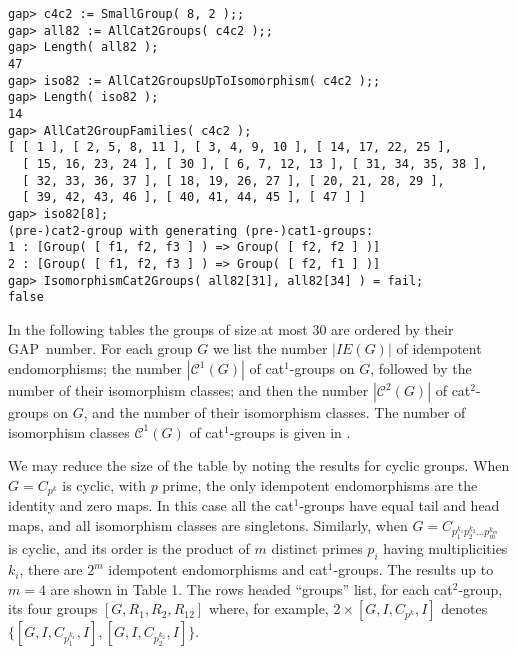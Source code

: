 \documentclass{ws-ijac}
\newcommand{\GAP}      {{\sf GAP}}
\newcommand{\calC}{\mathcal{C}}
\begin{document}
\small{
\begin{verbatim}
gap> c4c2 := SmallGroup( 8, 2 );;
gap> all82 := AllCat2Groups( c4c2 );;
gap> Length( all82 ); 
47
gap> iso82 := AllCat2GroupsUpToIsomorphism( c4c2 );;
gap> Length( iso82 ); 
14
gap> AllCat2GroupFamilies( c4c2 ); 
[ [ 1 ], [ 2, 5, 8, 11 ], [ 3, 4, 9, 10 ], [ 14, 17, 22, 25 ], 
  [ 15, 16, 23, 24 ], [ 30 ], [ 6, 7, 12, 13 ], [ 31, 34, 35, 38 ], 
  [ 32, 33, 36, 37 ], [ 18, 19, 26, 27 ], [ 20, 21, 28, 29 ], 
  [ 39, 42, 43, 46 ], [ 40, 41, 44, 45 ], [ 47 ] ]
gap> iso82[8]; 
(pre-)cat2-group with generating (pre-)cat1-groups:
1 : [Group( [ f1, f2, f3 ] ) => Group( [ f2, f2 ] )]
2 : [Group( [ f1, f2, f3 ] ) => Group( [ f2, f1 ] )]
gap> IsomorphismCat2Groups( all82[31], all82[34] ) = fail; 
false
\end{verbatim}
}

In the following tables the groups of size at most $30$ are ordered by their
\GAP\ number. 
For each group $G$ we list the number $|IE(G)|$ of idempotent endomorphisms; 
the number $|\calC^1(G)|$ of cat$^1$-groups on $G$, 
followed by the number of their isomorphism classes; 
and then the number $|\calC^2(G)|$ of cat$^2$-groups on $G$, 
and the number of their isomorphism classes. 
The number of isomorphism classes $\calC^1(G)$ of cat$^{1}$-groups 
is given in \cite{alp-wensley-ijac}. 

We may reduce the size of the table by noting the results for cyclic groups. 
When $G=C_{p^{k}}$ is cyclic, with $p$ prime, 
the only idempotent endomorphisms are the identity and zero maps. 
In this case all the cat$^1$-groups have equal tail and head maps, 
and all isomorphism classes are singletons. 
Similarly, when $G = C_{p_1^{k_1}p_2^{k_2} \ldots p_m^{k_m}}$ is cyclic, 
and its order is the product of $m$ distinct primes $p_i$ 
having multiplicities $k_i$, 
there are $2^m$ idempotent endomorphisms and cat$^1$-groups.  
The results up to $m=4$ are shown in Table 1. 
The rows headed ``groups'' list, for each cat$^2$-group, its four groups 
$[G,R_1,R_2,R_{12}]$ where, for example, $2 \times [G,I,C_{p^k},I]$ 
denotes $\{[G,I,C_{p_1^{k_1}},I],[G,I,C_{p_2^{k_2}},I]\}$. 
\end{document}
